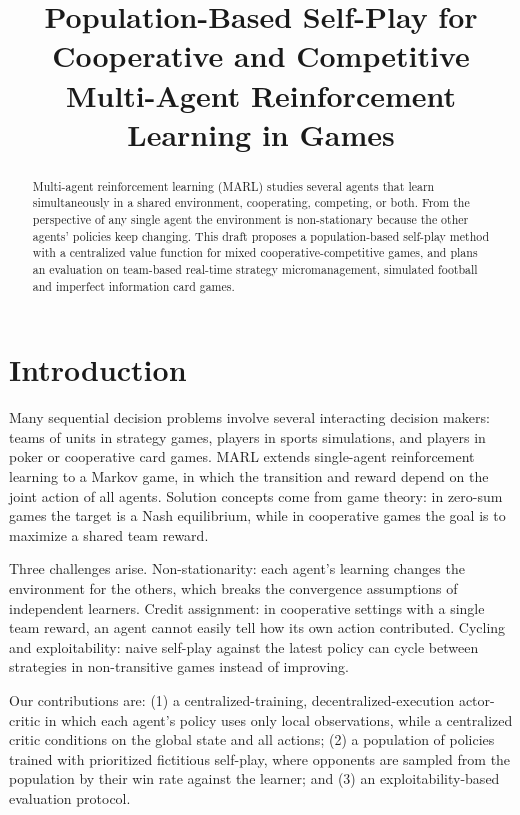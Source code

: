 \documentclass{article}
\title{Population-Based Self-Play for Cooperative and Competitive Multi-Agent Reinforcement Learning in Games}
\begin{document}
\maketitle

\begin{abstract}
Multi-agent reinforcement learning (MARL) studies several agents that learn
simultaneously in a shared environment, cooperating, competing, or both. From
the perspective of any single agent the environment is non-stationary because
the other agents' policies keep changing. This draft proposes a
population-based self-play method with a centralized value function for mixed
cooperative-competitive games, and plans an evaluation on team-based
real-time strategy micromanagement, simulated football and imperfect
information card games.
\end{abstract}

\section{Introduction}
Many sequential decision problems involve several interacting decision makers:
teams of units in strategy games, players in sports simulations, and players
in poker or cooperative card games. MARL extends single-agent reinforcement
learning to a Markov game, in which the transition and reward depend on the
joint action of all agents. Solution concepts come from game theory: in
zero-sum games the target is a Nash equilibrium, while in cooperative games
the goal is to maximize a shared team reward.

Three challenges arise. Non-stationarity: each agent's learning changes the
environment for the others, which breaks the convergence assumptions of
independent learners. Credit assignment: in cooperative settings with a single
team reward, an agent cannot easily tell how its own action contributed.
Cycling and exploitability: naive self-play against the latest policy can
cycle between strategies in non-transitive games instead of improving.

Our contributions are: (1) a centralized-training, decentralized-execution
actor-critic in which each agent's policy uses only local observations, while a
centralized critic conditions on the global state and all actions; (2) a
population of policies trained with prioritized fictitious self-play, where
opponents are sampled from the population by their win rate against the
learner; and (3) an exploitability-based evaluation protocol.
\end{document}
